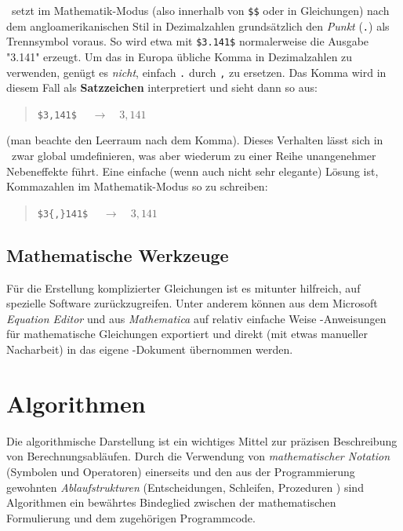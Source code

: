 \latex\ setzt im Mathematik-Modus (also innerhalb von \verb!$$! oder in Gleichungen) nach dem angloamerikanischen Stil in Dezimalzahlen grundsätzlich den \emph{Punkt} (\verb!.!) als Trennsymbol voraus. So wird etwa mit \verb!$3.141$! normalerweise die Ausgabe "3.141" erzeugt. Um das in Europa übliche Komma in Dezimalzahlen zu verwenden, genügt es \emph{nicht}, einfach \verb!.! durch \verb!,! zu ersetzen. Das Komma wird in diesem Fall
als \textbf{Satzzeichen} interpretiert und sieht dann so aus:
\begin{quote}
\verb!$3,141$!	$\quad \rightarrow \quad 3,141$ 
\end{quote}
(man beachte den Leerraum nach dem Komma). Dieses Verhalten lässt sich in \latex\ zwar global umdefinieren, was aber wiederum zu einer Reihe unangenehmer Nebeneffekte führt. Eine einfache (wenn auch nicht sehr elegante) Lösung ist, Kommazahlen im Mathematik-Modus so zu schreiben:
\begin{quote}
\verb!$3{,}141$!	$\quad \rightarrow \quad 3{,}141$
\end{quote}



\subsection{Mathematische Werkzeuge}

Für die Erstellung komplizierter Gleichungen ist es mitunter
hilfreich, auf spezielle Software zurückzugreifen. Unter anderem können
aus dem Microsoft \emph{Equation Editor} und aus {\em
Mathematica} auf relativ einfache Weise \latex-An\-wei\-sun\-gen
für mathematische Gleichungen exportiert und direkt (mit etwas
manueller Nacharbeit) in das eigene \latex-Dokument übernommen werden.


\section{Algorithmen}

Die algorithmische Darstellung ist ein wichtiges Mittel zur präzisen Beschreibung von 
Berechnungsabläufen. Durch die Verwendung von \emph{mathematischer Notation} (Symbolen und Operatoren) 
einerseits und den aus der Programmierung gewohnten \emph{Ablaufstrukturen} (Entscheidungen, Schleifen,
Prozeduren \etc) sind Algorithmen ein bewährtes Bindeglied zwischen der mathematischen Formulierung
und dem zugehörigen Programmcode.


